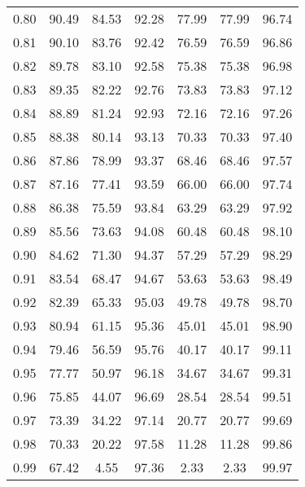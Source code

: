 \begin{tabular}{|c|c|c|c|c|c|c|}
      0.80 &     90.49 &     84.53 &      92.28 &   77.99 &      77.99 &         96.74 \\
      0.81 &     90.10 &     83.76 &      92.42 &   76.59 &      76.59 &         96.86 \\
      0.82 &     89.78 &     83.10 &      92.58 &   75.38 &      75.38 &         96.98 \\
      0.83 &     89.35 &     82.22 &      92.76 &   73.83 &      73.83 &         97.12 \\
      0.84 &     88.89 &     81.24 &      92.93 &   72.16 &      72.16 &         97.26 \\
      0.85 &     88.38 &     80.14 &      93.13 &   70.33 &      70.33 &         97.40 \\
      0.86 &     87.86 &     78.99 &      93.37 &   68.46 &      68.46 &         97.57 \\
      0.87 &     87.16 &     77.41 &      93.59 &   66.00 &      66.00 &         97.74 \\
      0.88 &     86.38 &     75.59 &      93.84 &   63.29 &      63.29 &         97.92 \\
      0.89 &     85.56 &     73.63 &      94.08 &   60.48 &      60.48 &         98.10 \\
      0.90 &     84.62 &     71.30 &      94.37 &   57.29 &      57.29 &         98.29 \\
      0.91 &     83.54 &     68.47 &      94.67 &   53.63 &      53.63 &         98.49 \\
      0.92 &     82.39 &     65.33 &      95.03 &   49.78 &      49.78 &         98.70 \\
      0.93 &     80.94 &     61.15 &      95.36 &   45.01 &      45.01 &         98.90 \\
      0.94 &     79.46 &     56.59 &      95.76 &   40.17 &      40.17 &         99.11 \\
      0.95 &     77.77 &     50.97 &      96.18 &   34.67 &      34.67 &         99.31 \\
      0.96 &     75.85 &     44.07 &      96.69 &   28.54 &      28.54 &         99.51 \\
      0.97 &     73.39 &     34.22 &      97.14 &   20.77 &      20.77 &         99.69 \\
      0.98 &     70.33 &     20.22 &      97.58 &   11.28 &      11.28 &         99.86 \\
      0.99 &     67.42 &      4.55 &      97.36 &    2.33 &       2.33 &         99.97 \\
\bottomrule
\end{tabular}

